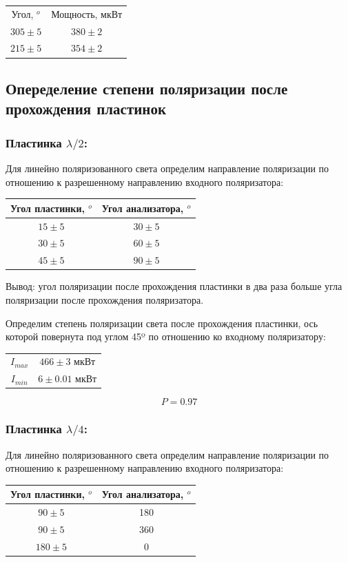 \documentclass[a4paper, 12pt]{article}
\begin{document}
\begin{center}
\begin{tabular}{ c c }

Угол, $^o$ & Мощность, мкВт\\
$305\pm 5 $&$380\pm2$\\
$215\pm 5 $& $354\pm2$\\
\end{tabular}
\end{center}


		\subsection{Опеределение степени поляризации после прохождения пластинок}


	\subsubsection{Пластинка $\lambda/2$:}
Для линейно поляризованного света определим направление поляризации по отношению к разрешенному направлению входного поляризатора:
\begin{center}
\begin{tabular}{ |c |c |}
\hline
Угол пластинки, $^o$  &Угол анализатора, $^o$\\
\hline
$15\pm 5 $ &$30 \pm 5 $ \\
$30\pm 5$ &$60\pm 5 $ \\
$45\pm 5$ & $90\pm 5 $  \\
\hline
\end{tabular}
\end{center}
Вывод: угол поляризации после прохождения пластинки  в два раза больше угла поляризации после прохождения поляризатора.

Определим степень поляризации света после прохождения пластинки, ось которой повернута под углом 45º по отношению ко входному поляризатору:
\begin{center}
\begin{tabular}{ c c }
$I_{max} $ &$466\pm3$ мкВт\\
$I_{min}$ & $6\pm0.01$ мкВт\\
\end{tabular}
\end{center}

\[P =0.97 \]

	\subsubsection{Пластинка $\lambda/4$:}
Для линейно поляризованного света определим направление поляризации по отношению к разрешенному направлению входного поляризатора:
\begin{center}
\begin{tabular}{ |c |c |}
\hline
Угол пластинки, $^o$  &Угол анализатора, $^o$\\
\hline
$90\pm 5 $ &180 \\
$90\pm 5$ &360 \\
$180\pm 5$ & 0 \\
\hline
\end{tabular}
\end{center}
\end{document}

